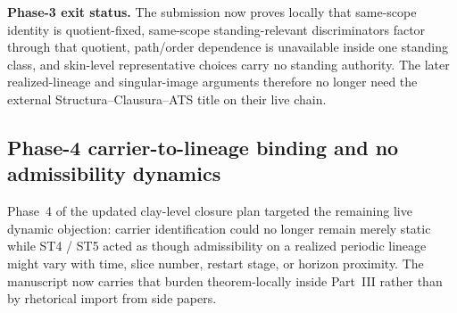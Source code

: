 \noindent\textbf{Phase-3 exit status.} The submission now proves locally that same-scope identity is quotient-fixed, same-scope standing-relevant discriminators factor through that quotient, path/order dependence is unavailable inside one standing class, and skin-level representative choices carry no standing authority. The later realized-lineage and singular-image arguments therefore no longer need the external Structura--Clausura--ATS title on their live chain.

\subsection*{Phase-4 carrier-to-lineage binding and no admissibility dynamics}
Phase~4 of the updated clay-level closure plan targeted the remaining live dynamic objection: carrier identification could no longer remain merely static while ST4 / ST5 acted as though admissibility on a realized periodic lineage might vary with time, slice number, restart stage, or horizon proximity. The manuscript now carries that burden theorem-locally inside Part~III rather than by rhetorical import from side papers.

